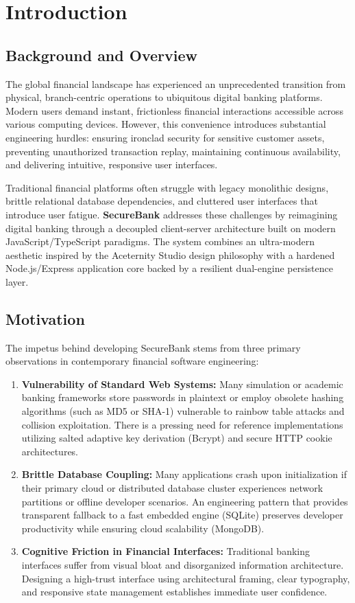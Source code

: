 \chapter{Introduction}

\section{Background and Overview}
The global financial landscape has experienced an unprecedented transition from physical, branch-centric operations to ubiquitous digital banking platforms. Modern users demand instant, frictionless financial interactions accessible across various computing devices. However, this convenience introduces substantial engineering hurdles: ensuring ironclad security for sensitive customer assets, preventing unauthorized transaction replay, maintaining continuous availability, and delivering intuitive, responsive user interfaces.

Traditional financial platforms often struggle with legacy monolithic designs, brittle relational database dependencies, and cluttered user interfaces that introduce user fatigue. \textbf{SecureBank} addresses these challenges by reimagining digital banking through a decoupled client-server architecture built on modern JavaScript/TypeScript paradigms. The system combines an ultra-modern aesthetic inspired by the Aceternity Studio design philosophy with a hardened Node.js/Express application core backed by a resilient dual-engine persistence layer.

\section{Motivation}
The impetus behind developing SecureBank stems from three primary observations in contemporary financial software engineering:
\begin{enumerate}
    \item \textbf{Vulnerability of Standard Web Systems:} Many simulation or academic banking frameworks store passwords in plaintext or employ obsolete hashing algorithms (such as MD5 or SHA-1) vulnerable to rainbow table attacks and collision exploitation. There is a pressing need for reference implementations utilizing salted adaptive key derivation (Bcrypt) and secure HTTP cookie architectures.
    \item \textbf{Brittle Database Coupling:} Many applications crash upon initialization if their primary cloud or distributed database cluster experiences network partitions or offline developer scenarios. An engineering pattern that provides transparent fallback to a fast embedded engine (SQLite) preserves developer productivity while ensuring cloud scalability (MongoDB).
    \item \textbf{Cognitive Friction in Financial Interfaces:} Traditional banking interfaces suffer from visual bloat and disorganized information architecture. Designing a high-trust interface using architectural framing, clear typography, and responsive state management establishes immediate user confidence.
\end{enumerate}

